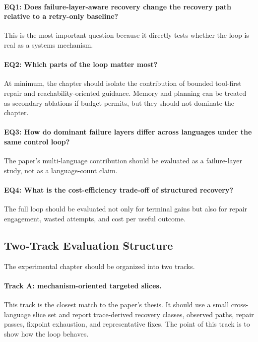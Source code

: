 \documentclass[10pt]{article}
\begin{document}
\paragraph{EQ1: Does failure-layer-aware recovery change the recovery path relative to a retry-only baseline?}
This is the most important question because it directly tests whether the loop is real as a systems mechanism.

\paragraph{EQ2: Which parts of the loop matter most?}
At minimum, the chapter should isolate the contribution of bounded tool-first repair and reachability-oriented guidance. Memory and planning can be treated as secondary ablations if budget permits, but they should not dominate the chapter.

\paragraph{EQ3: How do dominant failure layers differ across languages under the same control loop?}
The paper's multi-language contribution should be evaluated as a failure-layer study, not as a language-count claim.

\paragraph{EQ4: What is the cost-efficiency trade-off of structured recovery?}
The full loop should be evaluated not only for terminal gains but also for repair engagement, wasted attempts, and cost per useful outcome.

\subsection{Two-Track Evaluation Structure}

The experimental chapter should be organized into two tracks.

\paragraph{Track A: mechanism-oriented targeted slices.}
This track is the closest match to the paper's thesis. It should use a small cross-language slice set and report trace-derived recovery classes, observed paths, repair passes, fixpoint exhaustion, and representative fixes. The point of this track is to show how the loop behaves.
\end{document}
